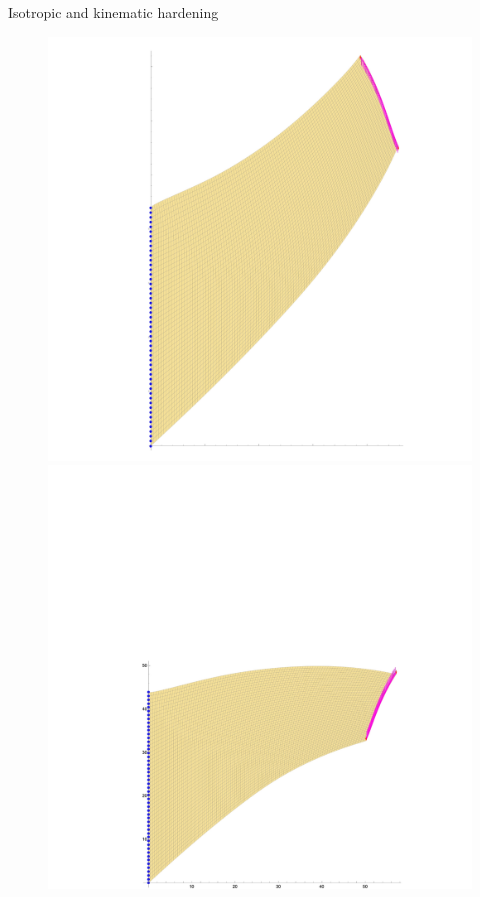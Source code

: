 \documentclass[aspectratio=169,xcolor=dvipsnames]{beamer}
\begin{document}
\begin{frame}{Isotropic and kinematic hardening}
\begin{figure}
\begin{minipage}{0.6\linewidth}
\begin{minipage}{0.5\linewidth}
\includegraphics[width=0.3\linewidth]{kin5.png}\hfill
\includegraphics[width=0.3\linewidth]{kin6.png}\hfill
		\end{minipage}\hfill
		\end{minipage}\hfill
	\end{figure}
\end{frame}
\end{document}

